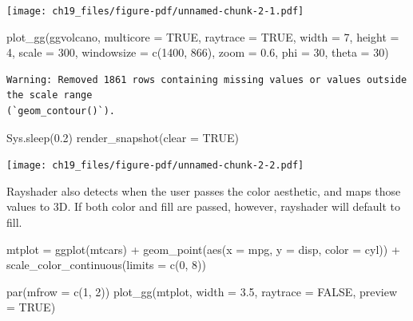\documentclass[
  letterpaper,
  DIV=11,
  numbers=noendperiod]{scrreprt}
\newenvironment{Shaded}{\begin{snugshade}}{\end{snugshade}}
\newcommand{\AttributeTok}[1]{\textcolor[rgb]{0.40,0.45,0.13}{#1}}
\newcommand{\ConstantTok}[1]{\textcolor[rgb]{0.56,0.35,0.01}{#1}}
\newcommand{\DecValTok}[1]{\textcolor[rgb]{0.68,0.00,0.00}{#1}}
\newcommand{\FloatTok}[1]{\textcolor[rgb]{0.68,0.00,0.00}{#1}}
\newcommand{\FunctionTok}[1]{\textcolor[rgb]{0.28,0.35,0.67}{#1}}
\newcommand{\NormalTok}[1]{\textcolor[rgb]{0.00,0.23,0.31}{#1}}
\newcommand{\OtherTok}[1]{\textcolor[rgb]{0.00,0.23,0.31}{#1}}
\newcommand{\SpecialCharTok}[1]{\textcolor[rgb]{0.37,0.37,0.37}{#1}}
\begin{document}
\texttt{[image: ch19\_files/figure-pdf/unnamed-chunk-2-1.pdf]}

\begin{Shaded}
\begin{Highlighting}[]
\FunctionTok{plot\_gg}\NormalTok{(ggvolcano, }\AttributeTok{multicore =} \ConstantTok{TRUE}\NormalTok{, }\AttributeTok{raytrace =} \ConstantTok{TRUE}\NormalTok{, }\AttributeTok{width =} \DecValTok{7}\NormalTok{, }\AttributeTok{height =} \DecValTok{4}\NormalTok{, }
        \AttributeTok{scale =} \DecValTok{300}\NormalTok{, }\AttributeTok{windowsize =} \FunctionTok{c}\NormalTok{(}\DecValTok{1400}\NormalTok{, }\DecValTok{866}\NormalTok{), }\AttributeTok{zoom =} \FloatTok{0.6}\NormalTok{, }\AttributeTok{phi =} \DecValTok{30}\NormalTok{, }\AttributeTok{theta =} \DecValTok{30}\NormalTok{)}
\end{Highlighting}
\end{Shaded}

\begin{verbatim}
Warning: Removed 1861 rows containing missing values or values outside the scale range
(`geom_contour()`).
\end{verbatim}

\begin{Shaded}
\begin{Highlighting}[]
\FunctionTok{Sys.sleep}\NormalTok{(}\FloatTok{0.2}\NormalTok{)}
\FunctionTok{render\_snapshot}\NormalTok{(}\AttributeTok{clear =} \ConstantTok{TRUE}\NormalTok{)}
\end{Highlighting}
\end{Shaded}

\texttt{[image: ch19\_files/figure-pdf/unnamed-chunk-2-2.pdf]}

Rayshader also detects when the user passes the color aesthetic, and
maps those values to 3D. If both color and fill are passed, however,
rayshader will default to fill.

\begin{Shaded}
\begin{Highlighting}[]
\NormalTok{mtplot }\OtherTok{=} \FunctionTok{ggplot}\NormalTok{(mtcars) }\SpecialCharTok{+} 
  \FunctionTok{geom\_point}\NormalTok{(}\FunctionTok{aes}\NormalTok{(}\AttributeTok{x =}\NormalTok{ mpg, }\AttributeTok{y =}\NormalTok{ disp, }\AttributeTok{color =}\NormalTok{ cyl)) }\SpecialCharTok{+} 
  \FunctionTok{scale\_color\_continuous}\NormalTok{(}\AttributeTok{limits =} \FunctionTok{c}\NormalTok{(}\DecValTok{0}\NormalTok{, }\DecValTok{8}\NormalTok{))}

\FunctionTok{par}\NormalTok{(}\AttributeTok{mfrow =} \FunctionTok{c}\NormalTok{(}\DecValTok{1}\NormalTok{, }\DecValTok{2}\NormalTok{))}
\FunctionTok{plot\_gg}\NormalTok{(mtplot, }\AttributeTok{width =} \FloatTok{3.5}\NormalTok{, }\AttributeTok{raytrace =} \ConstantTok{FALSE}\NormalTok{, }\AttributeTok{preview =} \ConstantTok{TRUE}\NormalTok{)}
\end{Highlighting}
\end{Shaded}
\end{document}
